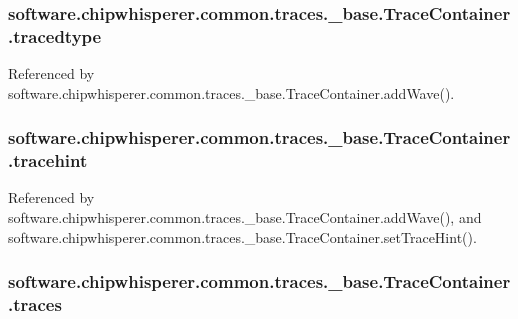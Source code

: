 \subsubsection[{tracedtype}]{\setlength{\rightskip}{0pt plus 5cm}software.\+chipwhisperer.\+common.\+traces.\+\_\+base.\+Trace\+Container.\+tracedtype}\label{classsoftware_1_1chipwhisperer_1_1common_1_1traces_1_1__base_1_1TraceContainer_a05023d9e7baaaf1474c3ec3dddbcefa8}


Referenced by software.\+chipwhisperer.\+common.\+traces.\+\_\+base.\+Trace\+Container.\+add\+Wave().

\hypertarget{classsoftware_1_1chipwhisperer_1_1common_1_1traces_1_1__base_1_1TraceContainer_af61441b531bf863d5fa8bc9bd250a439}{}
\subsubsection[{tracehint}]{\setlength{\rightskip}{0pt plus 5cm}software.\+chipwhisperer.\+common.\+traces.\+\_\+base.\+Trace\+Container.\+tracehint}\label{classsoftware_1_1chipwhisperer_1_1common_1_1traces_1_1__base_1_1TraceContainer_af61441b531bf863d5fa8bc9bd250a439}


Referenced by software.\+chipwhisperer.\+common.\+traces.\+\_\+base.\+Trace\+Container.\+add\+Wave(), and software.\+chipwhisperer.\+common.\+traces.\+\_\+base.\+Trace\+Container.\+set\+Trace\+Hint().

\hypertarget{classsoftware_1_1chipwhisperer_1_1common_1_1traces_1_1__base_1_1TraceContainer_ab5f9bde012609ff3df778893a84c21e8}{}
\subsubsection[{traces}]{\setlength{\rightskip}{0pt plus 5cm}software.\+chipwhisperer.\+common.\+traces.\+\_\+base.\+Trace\+Container.\+traces}\label{classsoftware_1_1chipwhisperer_1_1common_1_1traces_1_1__base_1_1TraceContainer_ab5f9bde012609ff3df778893a84c21e8}


